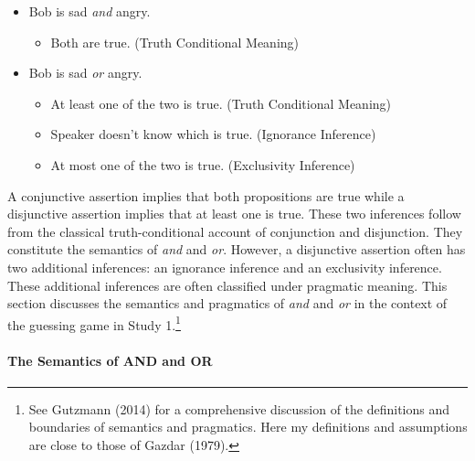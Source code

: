 \documentclass[man]{apa6}
\providecommand{\tightlist}{%
  \setlength{\itemsep}{0pt}\setlength{\parskip}{0pt}}
\theoremstyle{definition}
\theoremstyle{definition}
\theoremstyle{definition}
\theoremstyle{remark}
\begin{document}
\begin{itemize}
\tightlist
\item
  Bob is sad \emph{and} angry.

  \begin{itemize}
  \tightlist
  \item
    Both are true. (Truth Conditional Meaning)
  \end{itemize}
\item
  Bob is sad \emph{or} angry.

  \begin{itemize}
  \tightlist
  \item
    At least one of the two is true. (Truth Conditional Meaning)
  \item
    Speaker doesn't know which is true. (Ignorance Inference)
  \item
    At most one of the two is true. (Exclusivity Inference)
  \end{itemize}
\end{itemize}

A conjunctive assertion implies that both propositions are true while a
disjunctive assertion implies that at least one is true. These two
inferences follow from the classical truth-conditional account of
conjunction and disjunction. They constitute the semantics of \emph{and}
and \emph{or}. However, a disjunctive assertion often has two additional
inferences: an ignorance inference and an exclusivity inference. These
additional inferences are often classified under pragmatic meaning. This
section discusses the semantics and pragmatics of \emph{and} and
\emph{or} in the context of the guessing game in Study 1.\footnote{See
  Gutzmann (2014) for a comprehensive discussion of the definitions and
  boundaries of semantics and pragmatics. Here my definitions and
  assumptions are close to those of Gazdar (1979).}

\paragraph{The Semantics of AND and
OR}\label{the-semantics-of-and-and-or}
\end{document}
